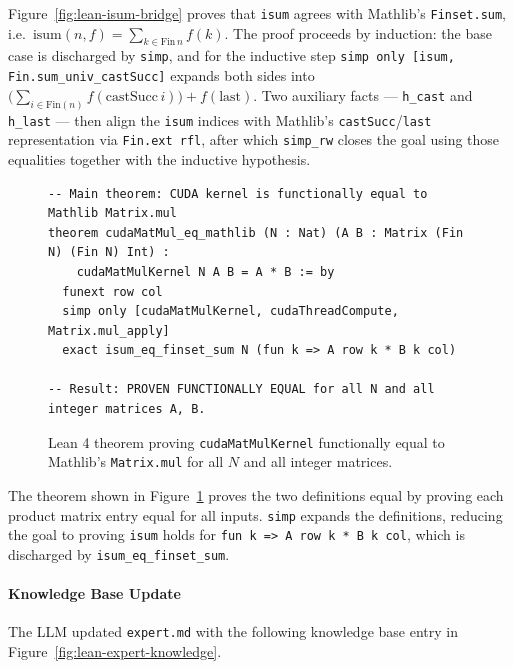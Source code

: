 \documentclass{article}
\begin{document}
Figure~\ref{fig:lean-isum-bridge} proves that \texttt{isum} agrees with Mathlib's \texttt{Finset.sum}, i.e.\ $\text{isum}(n, f) = \sum_{k \in \text{Fin}\,n} f(k)$. The proof proceeds by induction: the base case is discharged by \texttt{simp}, and for the inductive step \texttt{simp only [isum, Fin.sum\_univ\_castSucc]} expands both sides into $\bigl(\sum_{i \in \text{Fin}(n)} f(\text{castSucc}\,i)\bigr) + f(\text{last})$. Two auxiliary facts — \texttt{h\_cast} and \texttt{h\_last} — then align the \texttt{isum} indices with Mathlib's \texttt{castSucc}/\texttt{last} representation via \texttt{Fin.ext rfl}, after which \texttt{simp\_rw} closes the goal using those equalities together with the inductive hypothesis.

\begin{figure}[H]
\begin{verbatim}
-- Main theorem: CUDA kernel is functionally equal to Mathlib Matrix.mul
theorem cudaMatMul_eq_mathlib (N : Nat) (A B : Matrix (Fin N) (Fin N) Int) :
    cudaMatMulKernel N A B = A * B := by
  funext row col
  simp only [cudaMatMulKernel, cudaThreadCompute, Matrix.mul_apply]
  exact isum_eq_finset_sum N (fun k => A row k * B k col)

-- Result: PROVEN FUNCTIONALLY EQUAL for all N and all integer matrices A, B.
\end{verbatim}
\caption{Lean 4 theorem proving \texttt{cudaMatMulKernel} functionally equal to Mathlib's \texttt{Matrix.mul} for all $N$ and all integer matrices.}
\label{fig:lean-main-theorem}
\end{figure}

The theorem shown in Figure~\ref{fig:lean-main-theorem} proves the two definitions equal by proving each product matrix entry equal for all inputs. \texttt{simp} expands the definitions, reducing the goal to proving \texttt{isum} holds for \texttt{fun k => A row k * B k col}, which is discharged by \texttt{isum\_eq\_finset\_sum}.

\paragraph{Knowledge Base Update}

The LLM updated \texttt{expert.md} with the following knowledge base entry in Figure~\ref{fig:lean-expert-knowledge}.
\end{document}
